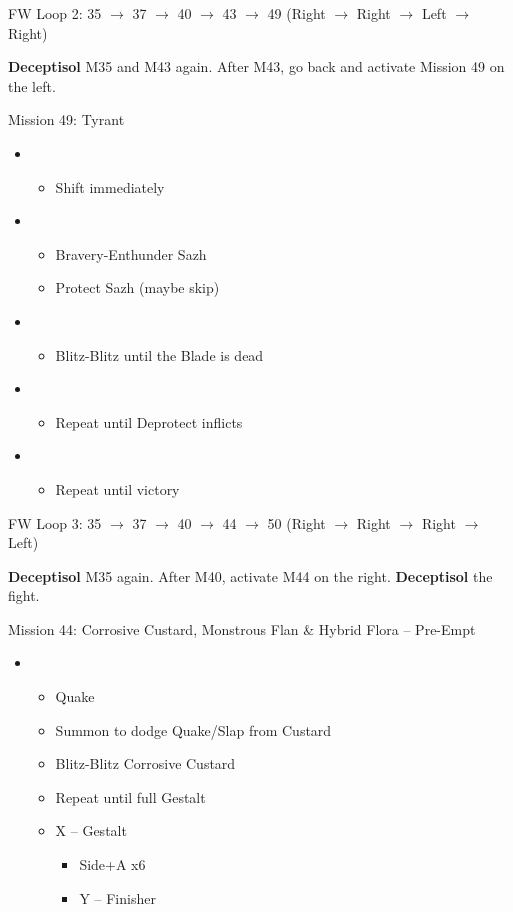 FW Loop 2: 35 $\rightarrow$ 37 $\rightarrow$ 40 $\rightarrow$ 43 $\rightarrow$ 49 (Right $\rightarrow$ Right $\rightarrow$ Left $\rightarrow$ Right)

\textbf{Deceptisol} M35 and M43 again.
After M43, go back and activate Mission 49 on the left.

\begin{battle}{Mission 49: Tyrant}
	\begin{itemize}
		\item \second
			\begin{itemize}
				\item Shift immediately
			\end{itemize}
		\item \third
			\begin{itemize}
				\item Bravery-Enthunder Sazh
				\item Protect Sazh (maybe skip)
			\end{itemize}
		\item \fifth
			\begin{itemize}
				\item Blitz-Blitz until the Blade is dead
			\end{itemize}
		\item \second
			\begin{itemize}
				\item Repeat until Deprotect inflicts
			\end{itemize}
		\item \first
			\begin{itemize}
				\item Repeat until victory
			\end{itemize}												
	\end{itemize}
\end{battle}

FW Loop 3: 35 $\rightarrow$ 37 $\rightarrow$ 40 $\rightarrow$ 44 $\rightarrow$ 50 (Right $\rightarrow$ Right $\rightarrow$ Right $\rightarrow$ Left)

\textbf{Deceptisol} M35 again.
After M40, activate M44 on the right.
\textbf{Deceptisol} the fight.

\begin{battle}{{Mission 44: Corrosive Custard, Monstrous Flan \& Hybrid Flora -- Pre-Empt}}
	\begin{itemize}
		\item \second
			\begin{itemize}
				\item Quake
				\item Summon to dodge Quake/Slap from Custard
				\item Blitz-Blitz Corrosive Custard
				\item Repeat until full Gestalt
				\item X -- Gestalt
					\begin{itemize}
						\item Side+A x6
						\item Y -- Finisher
					\end{itemize}
			\end{itemize}												
	\end{itemize}
\end{battle}


